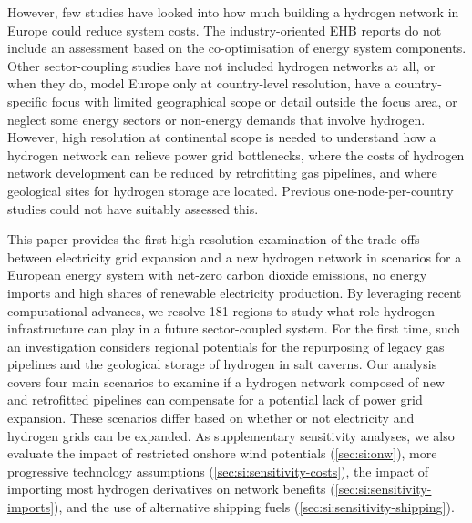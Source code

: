 However, few studies have looked into how much building a hydrogen network in
Europe could reduce system costs. The industry-oriented EHB reports do not
include an assessment based on the co-optimisation of energy system components.
\cite{gasforclimateEuropeanHydrogen2020,gasforclimateEuropeanHydrogen2021,gasforclimateExtendingEuropean2021,gasforclimateEuropeanHydrogen2022}
Other sector-coupling studies have not included hydrogen networks at all,
\cite{brownSynergiesSector2018,pickeringDiversityOptions2022,childFlexibleElectricity2019,kendziorskiCentralizedDecentral2022}
or when they do, model Europe only at country-level resolution,
\cite{europeancommission.directorategeneralforenergy.METISStudy2021,victoriaSpeedTechnological2022}
have a country-specific focus with limited geographical scope or detail outside
the focus area, \cite{gilsInteractionHydrogen2021} or neglect some energy
sectors or non-energy demands that involve hydrogen.
\cite{gilsInteractionHydrogen2021,Caglayan2019,caglayanRobustDesign2021}
However, high resolution at continental scope is needed to understand how a
hydrogen network can relieve power grid bottlenecks, where the costs of hydrogen
network development can be reduced by retrofitting gas pipelines, and where
geological sites for hydrogen storage are located. Previous one-node-per-country
studies could not have suitably assessed this.

This paper provides the first high-resolution examination of the trade-offs
between electricity grid expansion and a new hydrogen network in scenarios for a
European energy system with net-zero carbon dioxide emissions, no energy imports
and high shares of renewable electricity production. By leveraging recent
computational advances, we resolve 181 regions to study what role hydrogen
infrastructure can play in a future sector-coupled system. For the first time,
such an investigation considers regional potentials for the repurposing of
legacy gas pipelines and the geological storage of hydrogen in salt caverns. Our
analysis covers four main scenarios to examine if a hydrogen network composed of
new and retrofitted pipelines can compensate for a potential lack of power grid
expansion. These scenarios differ based on whether or not electricity and
hydrogen grids can be expanded. As supplementary sensitivity analyses, we also
evaluate the impact of restricted onshore wind potentials (\cref{sec:si:onw}),
more progressive technology assumptions
(\cref{sec:si:sensitivity-costs}), the impact of importing most hydrogen
derivatives on network benefits (\cref{sec:si:sensitivity-imports}), and the use
of alternative shipping fuels (\cref{sec:si:sensitivity-shipping}).

